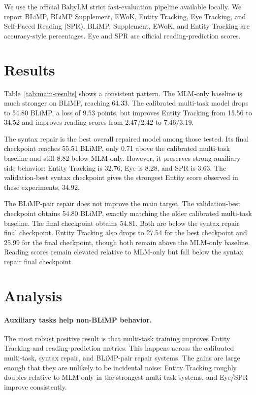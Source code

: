 \documentclass[11pt]{article}
\begin{document}
We use the official BabyLM strict fast-evaluation pipeline available locally. We report BLiMP, BLiMP Supplement, EWoK, Entity Tracking, Eye Tracking, and Self-Paced Reading (SPR). BLiMP, Supplement, EWoK, and Entity Tracking are accuracy-style percentages. Eye and SPR are official reading-prediction scores.



\section{Results}

Table~\ref{tab:main-results} shows a consistent pattern. The MLM-only baseline is much stronger on BLiMP, reaching 64.33. The calibrated multi-task model drops to 54.80 BLiMP, a loss of 9.53 points, but improves Entity Tracking from 15.56 to 34.52 and improves reading scores from 2.47/2.42 to 7.46/3.19.

The syntax repair is the best overall repaired model among those tested. Its final checkpoint reaches 55.51 BLiMP, only 0.71 above the calibrated multi-task baseline and still 8.82 below MLM-only. However, it preserves strong auxiliary-side behavior: Entity Tracking is 32.76, Eye is 8.28, and SPR is 3.63. The validation-best syntax checkpoint gives the strongest Entity score observed in these experiments, 34.92.

The BLiMP-pair repair does not improve the main target. The validation-best checkpoint obtains 54.80 BLiMP, exactly matching the older calibrated multi-task baseline. The final checkpoint obtains 54.81. Both are below the syntax repair final checkpoint. Entity Tracking also drops to 27.54 for the best checkpoint and 25.99 for the final checkpoint, though both remain above the MLM-only baseline. Reading scores remain elevated relative to MLM-only but fall below the syntax repair final checkpoint.

\section{Analysis}

\paragraph{Auxiliary tasks help non-BLiMP behavior.}
The most robust positive result is that multi-task training improves Entity Tracking and reading-prediction metrics. This happens across the calibrated multi-task, syntax repair, and BLiMP-pair repair systems. The gains are large enough that they are unlikely to be incidental noise: Entity Tracking roughly doubles relative to MLM-only in the strongest multi-task systems, and Eye/SPR improve consistently.
\end{document}
